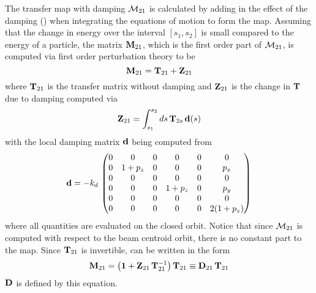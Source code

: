 The transfer map with damping ${\cal M}_{21}$ is calculated by adding in the effect of the damping
() when integrating the equations of motion to form the map. Assuming that the change in
energy over the interval $[s_1, s_2]$ is small compared to the energy of a particle, the matrix
${\bf M}_{21}$, which is the first order part of ${\cal M}_{21}$, is computed via first order perturbation
theory to be
\begin{equation}
  {\bf M}_{21} = {\bf T}_{21} + {\bf Z}_{21}
  \label{mtz}
\end{equation}
where ${\bf T}_{21}$ is the transfer matrix without damping and ${\bf Z}_{21}$ is the change in ${\bf T}$ due
to damping computed via
\begin{equation}
  {\bf Z}_{21} = \int_{s_1}^{s_2} ds \, {\bf T}_{2s} \, {\bf d}(s)
  \label{zstd}
\end{equation}
with the local damping matrix ${\bf d}$ being computed from 
\begin{equation}
  {\bf d} = -k_d \, \begin{pmatrix}
    0 & 0     & 0 & 0     & 0 & 0        \\
    0 & 1+p_z & 0 & 0     & 0 & p_x      \\
    0 & 0     & 0 & 0     & 0 & 0        \\
    0 & 0     & 0 & 1+p_z & 0 & p_y      \\
    0 & 0     & 0 & 0     & 0 & 0        \\
    0 & 0     & 0 & 0     & 0 & 2(1+p_z) \\
  \end{pmatrix}
\end{equation}
where all quantities are evaluated on the closed orbit.
Notice that since ${\cal M}_{21}$
is computed with respect to the beam centroid orbit, there is no constant part to the map. Since
${\bf T}_{21}$ is invertible,  can be written in the form
\begin{equation}
  {\bf M}_{21} = \bigl( \boldsymbol{1} + {\bf Z}_{21} \, {\bf T}_{21}^{-1} \bigr) \, {\bf T}_{21} 
  \equiv {\bf D}_{21} \, {\bf T}_{21} 
\end{equation}
${\bf D}$ is defined by this equation.

